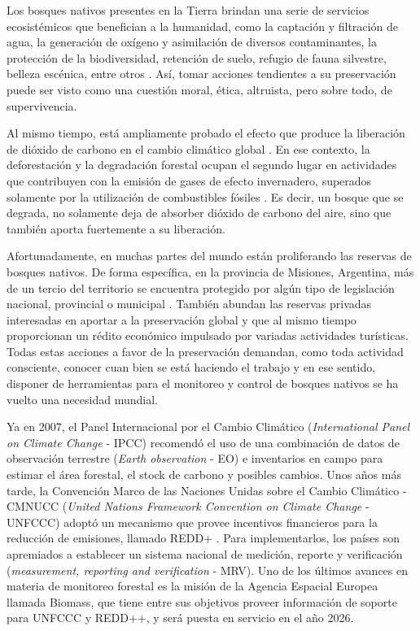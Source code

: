 
Los bosques nativos presentes en la Tierra brindan una serie de servicios ecosistémicos que benefician a la humanidad, como la captación y filtración de agua, la generación de oxígeno y asimilación de diversos contaminantes, la protección de la biodiversidad, retención de suelo, refugio de fauna silvestre, belleza escénica, entre otros \cite{lin_optimization_2023}. Así, tomar acciones tendientes a su preservación puede ser visto como una cuestión moral, ética, altruista, pero sobre todo, de supervivencia.

Al mismo tiempo, está ampliamente probado el efecto que produce la liberación de dióxido de carbono en el cambio climático global \cite{noauthor_pdf_nodate, kabir_climate_2023}. En ese contexto, la deforestación y la degradación forestal ocupan el segundo lugar en actividades que contribuyen con la emisión de gases de efecto invernadero, superados solamente por la utilización de combustibles fósiles \cite{chiriaco_deforestation_2024}. Es decir, un bosque que se degrada, no solamente deja de absorber dióxido de carbono del aire, sino que también aporta fuertemente a su liberación.

Afortunadamente, en muchas partes del mundo están proliferando las reservas de bosques nativos. De forma específica, en la provincia de Misiones, Argentina, más de un tercio del territorio se encuentra protegido por algún tipo de legislación nacional, provincial o municipal \cite{noauthor_revista_nodate}. También abundan las reservas privadas interesadas en aportar a la preservación global y que al mismo tiempo proporcionan un rédito económico impulsado por variadas actividades turísticas. Todas estas acciones a favor de la preservación demandan, como toda actividad consciente, conocer cuan bien se está haciendo el trabajo y en ese sentido, disponer de herramientas para el monitoreo y control de bosques nativos se ha vuelto una necesidad mundial.

Ya en 2007, el Panel Internacional por el Cambio Climático (\textit{International Panel on Climate Change} - IPCC) \cite{change_climate_2007} recomendó el uso de una combinación de datos de observación terrestre (\textit{Earth observation} - EO) e inventarios en campo para estimar el área forestal, el stock de carbono y posibles cambios.  Unos años más tarde, la Convención Marco de las Naciones Unidas sobre el Cambio Climático - CMNUCC (\textit{United Nations Framework Convention on Climate Change} - UNFCCC) adoptó un mecanismo que provee incentivos financieros para la reducción de emisiones, llamado REDD+ \cite{pistorius_red_2012}. Para implementarlos, los países son apremiados a establecer un sistema nacional de medición, reporte y verificación (\textit{measurement, reporting and verification} - MRV). Uno de los últimos avances en materia de monitoreo forestal es la misión de la Agencia Espacial Europea llamada Biomass\cite{noauthor_biomass_nodate}, que tiene entre sus objetivos proveer información de soporte para UNFCCC y REDD++, y será puesta en servicio en el año 2026.

